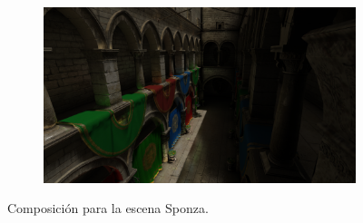 \begin{figure}[H]
\begin{subfigure}[t]{.49\linewidth}
	\end{subfigure}%
	\hspace{0.01\textwidth}
	\begin{subfigure}[t]{.49\linewidth}
		\centering
		\captionsetup{justification=centering}
		\includegraphics[width=\linewidth]{media/finals/sponza_gi.png}
	\end{subfigure}%
	\caption{Composición para la escena Sponza.}
	\label{fig:sponza_final}
\end{figure}
